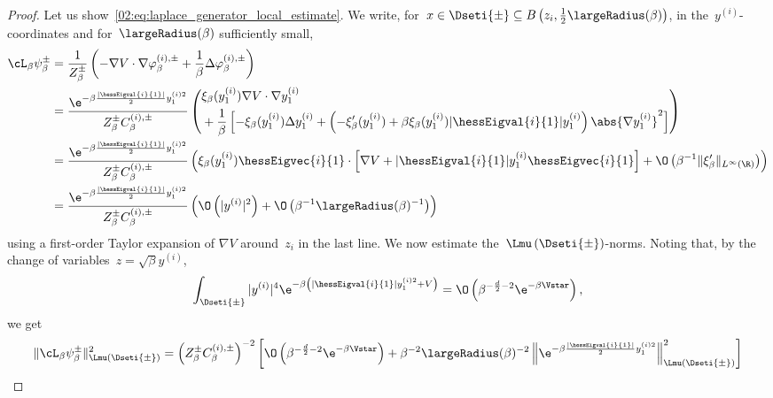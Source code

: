 \begin{proof}
            Let us show~\eqref{02:eq:laplace_generator_local_estimate}. We write, for~$x \in \Dseti{\pm} \subseteq B\left(z_i,\frac12\largeRadius(\beta)\right)$, in the~$y^{(i)}$-coordinates and for~$\largeRadius(\beta)$ sufficiently small,
            \begin{align*}
            \cL_\beta\psi^{\pm}_\beta &= \frac{1}{Z_\beta^{\pm}}\left(-\nabla V \cdot \nabla \varphi_\beta^{(i),\pm} + \frac{1}{\beta}\Delta\varphi_\beta^{(i),\pm}\right) \\
            &= \frac{\e^{-\beta\frac{|\hessEigval{i}{1}|}{2}y_1^{(i)2}}}{Z_\beta^\pm C_\beta^{(i),\pm}}
                \left( \begin{aligned} %
                    & \xi_\beta(y_1^{(i)})\nabla V \cdot \nabla y_1^{(i)} \\
                    & +\frac{1}{\beta} \left[ -\xi_\beta(y_1^{(i)})\Delta y_1^{(i)}+ \left(-\xi_\beta'(y_1^{(i)})+\beta \xi_\beta(y_1^{(i)})|\hessEigval{i}{1}|y_1^{(i)}\right) \abs{\nabla y_1^{(i)}}^2 \right]
                \end{aligned} \right) \\ %
            &= \frac{\e^{-\beta\frac{|\hessEigval{i}{1}|}{2}y_1^{(i)2}}}{Z_\beta^\pm C_\beta^{(i),\pm}} \left(\xi_\beta(y_1^{(i)})\hessEigvec{i}{1}\cdot\left[\nabla V+|\hessEigval{i}{1}|y_1^{(i)}\hessEigvec{i}{1}\right] + \O\left(\beta^{-1}\|\xi_\beta'\|_{L^\infty(\R)}\right)\right) \\
            &= \frac{\e^{-\beta\frac{|\hessEigval{i}{1}|}{2}y_1^{(i)2}}}{Z_\beta^\pm C_\beta^{(i),\pm}} \left(\O\left(|y^{(i)}|^2\right) + \O\left(\beta^{-1}\largeRadius(\beta)^{-1}\right)\right)
            \end{align*}
            using a first-order Taylor expansion of $\nabla V$ around~$z_i$ in the last line. We now estimate the~$\Lmu\left(\Dseti{\pm}\right)$-norms.
            Noting that, by the change of variables~$z = \sqrt\beta y^{(i)}$,
            \[\int_{\Dseti{\pm}}|y^{(i)}|^4\e^{-\beta\left(|\hessEigval{i}{1}|y_1^{(i)2}+V\right)}=\O\left(\beta^{-\frac{d}2-2}\e^{-\beta\Vstar}\right),\]
            we get
            \begin{equation}
                \begin{aligned}
                \|\cL_\beta\psi_\beta^{\pm}\|^2_{\Lmu(\Dseti{\pm})} &= \left(Z_\beta^\pm C_\beta^{(i),\pm}\right)^{-2}\left[\O\left(\beta^{-\frac{d}2-2}\e^{-\beta\Vstar}\right)+\beta^{-2}\largeRadius(\beta)^{-2}\left\|\e^{-\beta\frac{|\hessEigval{i}{1}|}{2}y_1^{(i)2}}\right\|^2_{\Lmu(\Dseti{\pm})}\right]\\

\end{aligned}
\end{equation}
\end{proof}
